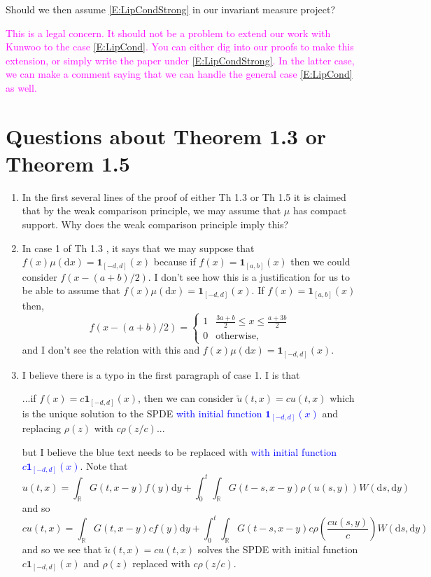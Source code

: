\documentclass{article}
\numberwithin{equation}{section}
\newcommand{\R}{\mathbb{R}}
\newcommand{\ud}{\ensuremath{\mathrm{d}}}
\begin{document}
Should we then assume \eqref{E:LipCondStrong} in our invariant measure project?
\bigskip

\textcolor{magenta}{This is a legal concern. It should not be a problem to extend our work with Kunwoo \cite{CK19} to the case
\eqref{E:LipCond}. You can either dig into our proofs to make this extension, or simply write the paper under
\eqref{E:LipCondStrong}. In the latter case, we can make a comment saying that we can handle the general case
\eqref{E:LipCond} as well.}

\section{Questions about Theorem 1.3 \cite{CK17} or Theorem 1.5 \cite{CH19}}
\begin{enumerate}
	\item
In the first several lines of the proof of either Th 1.3 \cite{CK17} or Th 1.5 \cite{CH19} it is claimed that by the weak comparison principle, we may assume that $\mu$ has compact support. Why does the weak comparison principle imply this?

	\item
In case 1 of Th 1.3 \cite{CK17}, it says that we may suppose that $f(x)\mu(\ud x) = \textbf{1}_{[-d,d]}(x)$ because if $f(x) =\textbf{1}_{[a,b]}(x)$ then we could consider $f(x-(a+b)/2)$. I don't see how this is a justification for us to be able to assume that $f(x)\mu(\ud x) = \textbf{1}_{[-d,d]}(x)$.  If $f(x) =\textbf{1}_{[a,b]}(x)$ then,
	\[
		f(x-(a+b)/2) =
		\begin{cases}
			1 & \frac{3a + b}{2} \le x \le \frac{a + 3b}{2} \\
			0 & \text{otherwise},
		\end{cases}
	\]
and I don't see the relation with this and $f(x)\mu(\ud x) = \textbf{1}_{[-d,d]}(x)$.

	\item
I believe there is a typo in the first paragraph of case 1. I is that
	\begin{center}
		...if $f(x) = c\textbf{1}_{[-d,d]}(x)$, then we can consider $\tilde{u}(t,x) = c u(t,x)$ which is the unique solution to the SPDE \textcolor{blue}{with initial function $\textbf{1}_{[-d,d]}(x)$} and replacing $\rho(z)$ with $c\rho(z/c)$...
	\end{center}
but I believe the blue text needs to be replaced with \textcolor{blue}{with initial function $c\textbf{1}_{[-d,d]}(x)$}. Note that
	\[
		u(t,x) = \int_{\R} G(t,x-y)f(y) \ud y + \int_0^t\int_{\R} G(t-s,x-y) \rho(u(s,y)) W(\ud s, \ud y)
	\]
and so
	\[
		cu(t,x) = \int_{\R} G(t,x-y) cf(y) \ud y + \int_0^t\int_{\R} G(t-s,x-y) c\rho\left(\frac{c u(s,y)}{c}\right) W(\ud s, \ud y)
	\]
and so we see that $\tilde{u}(t,x) = c u(t,x)$ solves the SPDE with initial function $c\textbf{1}_{[-d,d]}(x)$ and $\rho(z)$ replaced with $c\rho(z/c)$.


\end{enumerate}
\end{document}

